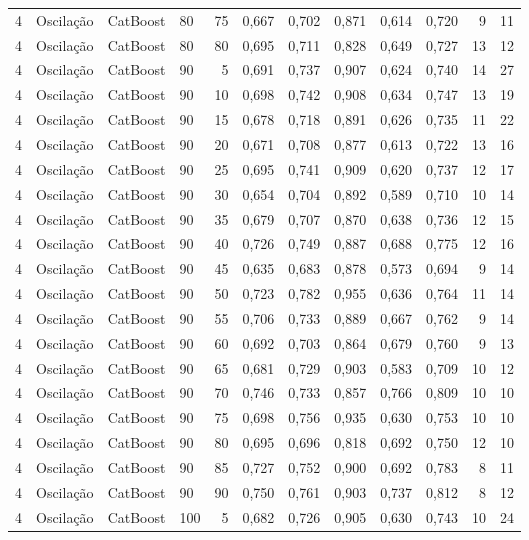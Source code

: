 \begin{longtable}{ccclrrrrrrrr}
4 & Oscilação & CatBoost & 80 & 75 & 0,667 & 0,702 & 0,871 & 0,614 & 0,720 & 9 & 11 \\
4 & Oscilação & CatBoost & 80 & 80 & 0,695 & 0,711 & 0,828 & 0,649 & 0,727 & 13 & 12 \\
4 & Oscilação & CatBoost & 90 & 5 & 0,691 & 0,737 & 0,907 & 0,624 & 0,740 & 14 & 27 \\
4 & Oscilação & CatBoost & 90 & 10 & 0,698 & 0,742 & 0,908 & 0,634 & 0,747 & 13 & 19 \\
4 & Oscilação & CatBoost & 90 & 15 & 0,678 & 0,718 & 0,891 & 0,626 & 0,735 & 11 & 22 \\
4 & Oscilação & CatBoost & 90 & 20 & 0,671 & 0,708 & 0,877 & 0,613 & 0,722 & 13 & 16 \\
4 & Oscilação & CatBoost & 90 & 25 & 0,695 & 0,741 & 0,909 & 0,620 & 0,737 & 12 & 17 \\
4 & Oscilação & CatBoost & 90 & 30 & 0,654 & 0,704 & 0,892 & 0,589 & 0,710 & 10 & 14 \\
4 & Oscilação & CatBoost & 90 & 35 & 0,679 & 0,707 & 0,870 & 0,638 & 0,736 & 12 & 15 \\
4 & Oscilação & CatBoost & 90 & 40 & 0,726 & 0,749 & 0,887 & 0,688 & 0,775 & 12 & 16 \\
4 & Oscilação & CatBoost & 90 & 45 & 0,635 & 0,683 & 0,878 & 0,573 & 0,694 & 9 & 14 \\
4 & Oscilação & CatBoost & 90 & 50 & 0,723 & 0,782 & 0,955 & 0,636 & 0,764 & 11 & 14 \\
4 & Oscilação & CatBoost & 90 & 55 & 0,706 & 0,733 & 0,889 & 0,667 & 0,762 & 9 & 14 \\
4 & Oscilação & CatBoost & 90 & 60 & 0,692 & 0,703 & 0,864 & 0,679 & 0,760 & 9 & 13 \\
4 & Oscilação & CatBoost & 90 & 65 & 0,681 & 0,729 & 0,903 & 0,583 & 0,709 & 10 & 12 \\
4 & Oscilação & CatBoost & 90 & 70 & 0,746 & 0,733 & 0,857 & 0,766 & 0,809 & 10 & 10 \\
4 & Oscilação & CatBoost & 90 & 75 & 0,698 & 0,756 & 0,935 & 0,630 & 0,753 & 10 & 10 \\
4 & Oscilação & CatBoost & 90 & 80 & 0,695 & 0,696 & 0,818 & 0,692 & 0,750 & 12 & 10 \\
4 & Oscilação & CatBoost & 90 & 85 & 0,727 & 0,752 & 0,900 & 0,692 & 0,783 & 8 & 11 \\
4 & Oscilação & CatBoost & 90 & 90 & 0,750 & 0,761 & 0,903 & 0,737 & 0,812 & 8 & 12 \\
4 & Oscilação & CatBoost & 100 & 5 & 0,682 & 0,726 & 0,905 & 0,630 & 0,743 & 10 & 24 \\

\end{longtable}
